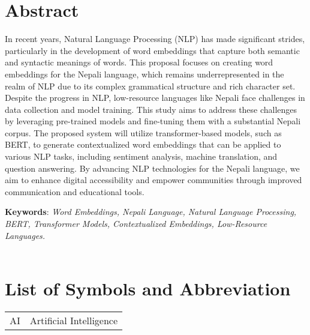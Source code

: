 		
		
		\large
			\chapter*{Abstract}
		\normalsize
        \noindent
		In recent years, Natural Language Processing (NLP) has made significant strides, particularly in the development of word embeddings that capture both semantic and syntactic meanings of words. This proposal focuses on creating word embeddings for the Nepali language, which remains underrepresented in the realm of NLP due to its complex grammatical structure and rich character set. Despite the progress in NLP, low-resource languages like Nepali face challenges in data collection and model training. This study aims to address these challenges by leveraging pre-trained models and fine-tuning them with a substantial Nepali corpus. The proposed system will utilize transformer-based models, such as BERT, to generate contextualized word embeddings that can be applied to various NLP tasks, including sentiment analysis, machine translation, and question answering. By advancing NLP technologies for the Nepali language, we aim to enhance digital accessibility and empower communities through improved communication and educational tools.

		\noindent
		\textbf{Keywords}: 
		\textit{Word Embeddings, Nepali Language, Natural Language Processing, BERT, Transformer Models, Contextualized Embeddings, Low-Resource Languages.\\
 }\\

		\break


	    \tableofcontents

		\listoftables
		\break
		\pagebreak

		\listoffigures
		\break
	
	
	
		\Large
			\begingroup
				\let\clearpage\relax
				\chapter*{List of Symbols and Abbreviation}
			\endgroup
   
		\normalsize
		\begin{tabular}{p{1in}p{5in}} 
                AI & Artificial Intelligence\\
                
            \end{tabular}





		\break
		\pagebreak
		
	